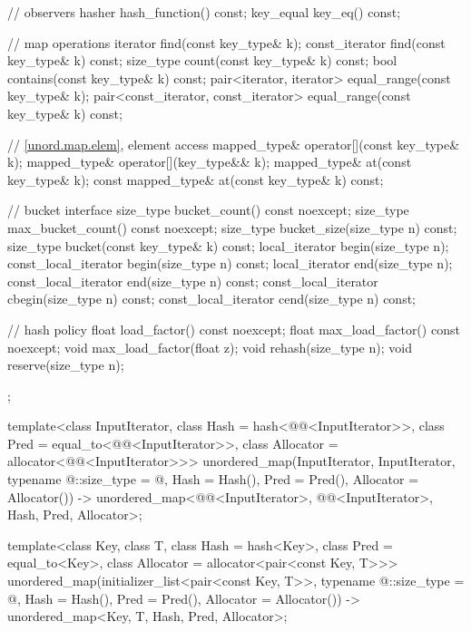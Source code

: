 \begin{codeblock}
{{    // observers
    hasher hash_function() const;
    key_equal key_eq() const;

    // map operations
    iterator       find(const key_type& k);
    const_iterator find(const key_type& k) const;
    size_type      count(const key_type& k) const;
    bool           contains(const key_type& k) const;
    pair<iterator, iterator>             equal_range(const key_type& k);
    pair<const_iterator, const_iterator> equal_range(const key_type& k) const;

    // \ref{unord.map.elem}, element access
    mapped_type& operator[](const key_type& k);
    mapped_type& operator[](key_type&& k);
    mapped_type& at(const key_type& k);
    const mapped_type& at(const key_type& k) const;

    // bucket interface
    size_type bucket_count() const noexcept;
    size_type max_bucket_count() const noexcept;
    size_type bucket_size(size_type n) const;
    size_type bucket(const key_type& k) const;
    local_iterator begin(size_type n);
    const_local_iterator begin(size_type n) const;
    local_iterator end(size_type n);
    const_local_iterator end(size_type n) const;
    const_local_iterator cbegin(size_type n) const;
    const_local_iterator cend(size_type n) const;

    // hash policy
    float load_factor() const noexcept;
    float max_load_factor() const noexcept;
    void max_load_factor(float z);
    void rehash(size_type n);
    void reserve(size_type n);
  };

  template<class InputIterator,
           class Hash = hash<@@<InputIterator>>,
           class Pred = equal_to<@@<InputIterator>>,
           class Allocator = allocator<@@<InputIterator>>>
    unordered_map(InputIterator, InputIterator, typename @\seebelow@::size_type = @\seebelow@,
                  Hash = Hash(), Pred = Pred(), Allocator = Allocator())
      -> unordered_map<@@<InputIterator>, @@<InputIterator>, Hash, Pred,
                       Allocator>;

  template<class Key, class T, class Hash = hash<Key>,
           class Pred = equal_to<Key>, class Allocator = allocator<pair<const Key, T>>>
    unordered_map(initializer_list<pair<const Key, T>>,
                  typename @\seebelow@::size_type = @\seebelow@, Hash = Hash(),
                  Pred = Pred(), Allocator = Allocator())
      -> unordered_map<Key, T, Hash, Pred, Allocator>;

}
\end{codeblock}
